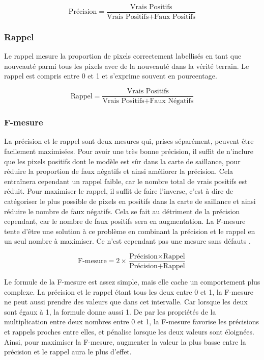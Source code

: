 	\begin{equation}
		\text{Précision} = \frac{\text{Vrais Positifs}}{\text{Vrais Positifs} + \text{Faux Positifs}}
	\end{equation}

	\subsubsection{Rappel}

	Le rappel mesure la proportion de pixels correctement labellisés en tant que nouveauté parmi tous les pixels avec de la nouveauté dans la vérité terrain. Le rappel est compris entre 0 et 1 et s'exprime souvent en pourcentage.

	\begin{equation}
		\text{Rappel} = \frac{\text{Vrais Positifs}}{\text{Vrais Positifs} + \text{Faux Négatifs}}
	\end{equation}

	\subsubsection{F-mesure}

	La précision et le rappel sont deux mesures qui, prises séparément, peuvent être facilement maximisées. Pour avoir une très bonne précision, il suffit de n'inclure que les pixels positifs dont le modèle est sûr dans la carte de saillance, pour réduire la proportion de faux négatifs et ainsi améliorer la précision. Cela entraînera cependant un rappel faible, car le nombre total de vrais positifs est réduit. Pour maximiser le rappel, il suffit de faire l'inverse, c'est à dire de catégoriser le plus possible de pixels en positifs dans la carte de saillance et ainsi réduire le nombre de faux négatifs. Cela se fait au détriment de la précision cependant, car le nombre de faux positifs sera en augmentation. La F-mesure \cite{hripcsak-fmeasure} tente d'être une solution à ce problème en combinant la précision et le rappel en un seul nombre à maximiser. Ce n'est cependant pas une mesure sans défauts \cite{powers-fmeasure}.

	\begin{equation}
		\text{F-mesure} = 2 \times \frac{\text{Précision} \times \text{Rappel}}{\text{Précision}+\text{Rappel}}
	\end{equation}

	Le formule de la F-mesure est assez simple, mais elle cache un comportement plus complexe. La précision et le rappel étant tous les deux entre 0 et 1, la F-mesure ne peut aussi prendre des valeurs que dans cet intervalle. Car lorsque les deux sont égaux à 1, la formule donne aussi 1. De par les propriétés de la multiplication entre deux nombres entre 0 et 1, la F-mesure favorise les précisions et rappels proches entre elles, et pénalise lorsque les deux valeurs sont éloignées. Ainsi, pour maximiser la F-mesure, augmenter la valeur la plus basse entre la précision et le rappel aura le plus d'effet.
	
